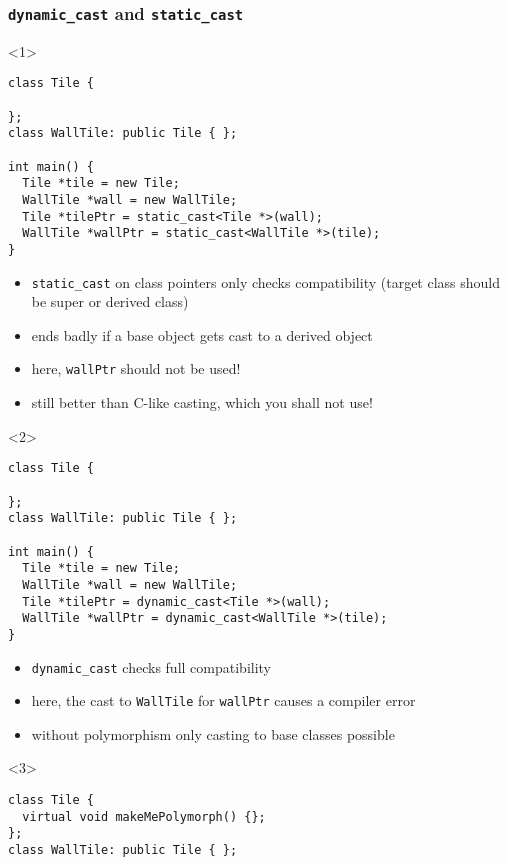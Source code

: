 \documentclass{slides}
\begin{document}
\begin{frame}[fragile]
  \frametitle{\lstinline!dynamic_cast! and \lstinline!static_cast!}

  \begin{onlyenv}<1>
\begin{lstlisting}[emph={static_cast}]
class Tile {

};
class WallTile: public Tile { };

int main() {
  Tile *tile = new Tile;
  WallTile *wall = new WallTile;
  Tile *tilePtr = static_cast<Tile *>(wall);
  WallTile *wallPtr = static_cast<WallTile *>(tile);
}
\end{lstlisting}
    \begin{itemize}
    \item \lstinline!static_cast! on class pointers only checks
      compatibility (target class should be super or derived class)
    \item ends badly if a base object gets cast to a derived object
    \item here, \lstinline!wallPtr! should not be used!
    \item still better than C-like casting, which \alert{you shall not use!}
    \end{itemize}
  \end{onlyenv}

  \begin{onlyenv}<2>
\begin{lstlisting}[emph={dynamic_cast}]
class Tile {

};
class WallTile: public Tile { };

int main() {
  Tile *tile = new Tile;
  WallTile *wall = new WallTile;
  Tile *tilePtr = dynamic_cast<Tile *>(wall);
  WallTile *wallPtr = dynamic_cast<WallTile *>(tile);
}
\end{lstlisting}
    \begin{itemize}
    \item \lstinline!dynamic_cast! checks full compatibility
    \item here, the cast to \lstinline!WallTile! for
      \lstinline!wallPtr! causes a compiler error
    \item without polymorphism only casting to base classes possible
    \end{itemize}
  \end{onlyenv}

  \begin{onlyenv}<3>
\begin{lstlisting}[emph={dynamic_cast,makeMePolymorph}]
class Tile {
  virtual void makeMePolymorph() {};
};
class WallTile: public Tile { };


\end{lstlisting}
\end{onlyenv}
\end{frame}
\end{document}
